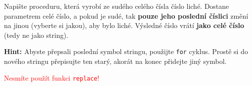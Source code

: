 \question[70]
Napište proceduru, která vyrobí ze sudého celého čísla číslo liché. Dostane
parametrem celé číslo, a pokud je sudé, tak \textbf{pouze jeho poslední číslici}
změní na jinou (vyberte si jakou), aby bylo liché. Výsledné číslo vrátí
\textbf{jako celé číslo} (tedy ne jako string).

\textbf{Hint:} Abyste přepsali poslední symbol stringu, použijte \texttt{for}
cyklus. Prostě si do nového stringu přepisujte ten starý, akorát na konec
přidejte jiný symbol.

\textcolor{red}{Nesmíte použít funkci \texttt{replace}!}